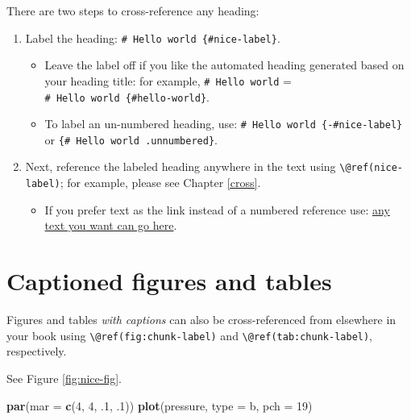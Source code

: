 \documentclass[
]{book}
\newenvironment{Shaded}{\begin{snugshade}}{\end{snugshade}}
\newcommand{\AttributeTok}[1]{\textcolor[rgb]{0.13,0.29,0.53}{#1}}
\newcommand{\DecValTok}[1]{\textcolor[rgb]{0.00,0.00,0.81}{#1}}
\newcommand{\FunctionTok}[1]{\textcolor[rgb]{0.13,0.29,0.53}{\textbf{#1}}}
\newcommand{\NormalTok}[1]{#1}
\newcommand{\StringTok}[1]{\textcolor[rgb]{0.31,0.60,0.02}{#1}}
\providecommand{\tightlist}{%
  \setlength{\itemsep}{0pt}\setlength{\parskip}{0pt}}
\begin{document}
There are two steps to cross-reference any heading:

\begin{enumerate}
\def\labelenumi{\arabic{enumi}.}
\tightlist
\item
  Label the heading: \texttt{\#\ Hello\ world\ \{\#nice-label\}}.

  \begin{itemize}
  \tightlist
  \item
    Leave the label off if you like the automated heading generated based on your heading title: for example, \texttt{\#\ Hello\ world} = \texttt{\#\ Hello\ world\ \{\#hello-world\}}.
  \item
    To label an un-numbered heading, use: \texttt{\#\ Hello\ world\ \{-\#nice-label\}} or \texttt{\{\#\ Hello\ world\ .unnumbered\}}.
  \end{itemize}
\item
  Next, reference the labeled heading anywhere in the text using \texttt{\textbackslash{}@ref(nice-label)}; for example, please see Chapter \ref{cross}.

  \begin{itemize}
  \tightlist
  \item
    If you prefer text as the link instead of a numbered reference use: \hyperref[cross]{any text you want can go here}.
  \end{itemize}
\end{enumerate}

\section{Captioned figures and tables}\label{captioned-figures-and-tables}

Figures and tables \emph{with captions} can also be cross-referenced from elsewhere in your book using \texttt{\textbackslash{}@ref(fig:chunk-label)} and \texttt{\textbackslash{}@ref(tab:chunk-label)}, respectively.

See Figure \ref{fig:nice-fig}.

\begin{Shaded}
\begin{Highlighting}[]
\FunctionTok{par}\NormalTok{(}\AttributeTok{mar =} \FunctionTok{c}\NormalTok{(}\DecValTok{4}\NormalTok{, }\DecValTok{4}\NormalTok{, .}\DecValTok{1}\NormalTok{, .}\DecValTok{1}\NormalTok{))}
\FunctionTok{plot}\NormalTok{(pressure, }\AttributeTok{type =} \StringTok{\textquotesingle{}b\textquotesingle{}}\NormalTok{, }\AttributeTok{pch =} \DecValTok{19}\NormalTok{)}
\end{Highlighting}
\end{Shaded}
\end{document}
